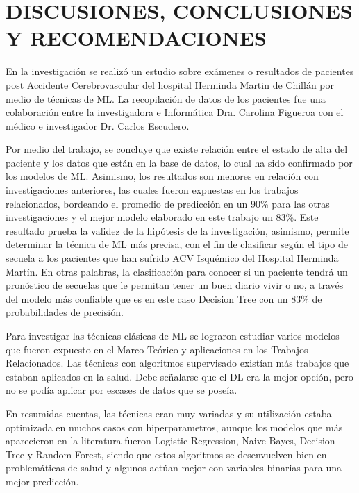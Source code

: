 \doublespacing
\chapter{DISCUSIONES, CONCLUSIONES Y RECOMENDACIONES}

\par En la investigación se realizó un estudio sobre exámenes o resultados de pacientes post Accidente Cerebrovascular del hospital Herminda Martin de Chillán por medio de técnicas de ML. La recopilación de datos de los pacientes fue una colaboración entre la investigadora e Informática Dra. Carolina Figueroa con el médico e investigador Dr. Carlos Escudero.\\

\par Por medio del trabajo, se concluye que existe relación entre el estado de alta del paciente y los datos que están en la base de datos, lo cual ha sido confirmado por los modelos de ML. Asimismo, los resultados son menores en relación con investigaciones anteriores, las cuales fueron expuestas en los trabajos relacionados, bordeando el promedio de predicción en un 90\% para las otras investigaciones y el mejor modelo elaborado en este trabajo un 83\%. Este resultado prueba la validez de la hipótesis de la investigación, asimismo, permite determinar la técnica de ML más precisa, con el fin de clasificar según el tipo de secuela a los pacientes que han sufrido ACV Isquémico del Hospital Herminda Martín. En otras palabras, la clasificación para conocer si un paciente tendrá un pronóstico de secuelas que le permitan tener un buen diario vivir o no, a través del modelo más confiable que es en este caso Decision Tree con un 83\% de probabilidades de precisión.\\

\par Para investigar las técnicas clásicas de ML se lograron estudiar varios modelos que fueron expuesto en el Marco Teórico y aplicaciones en los Trabajos Relacionados. Las técnicas con algoritmos supervisado existían más trabajos que estaban aplicados en la salud. Debe señalarse que el DL era la mejor opción, pero no se podía aplicar por escases de datos que se poseía.\\

\par En resumidas cuentas, las técnicas eran muy variadas y su utilización estaba optimizada en muchos casos con hiperparametros, aunque los modelos que más aparecieron en la literatura fueron Logistic Regression, Naive Bayes, Decision Tree y Random Forest, siendo que estos algoritmos se desenvuelven bien en problemáticas de salud y algunos actúan mejor con variables binarias para una mejor predicción.\\

